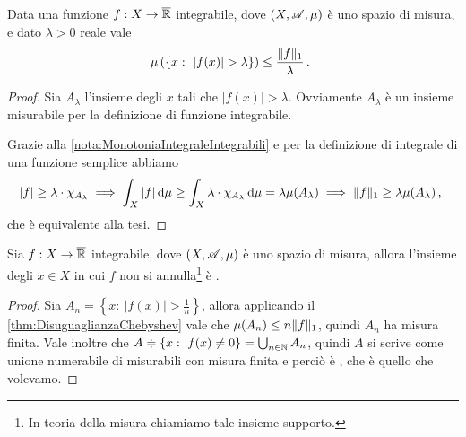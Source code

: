 \begin{theorem}\label{thm:DisuguaglianzaChebyshev}
	Data una funzione $f:X\to\overline{\mathbb R}$ integrabile, dove $(X,\mathscr A,\mu)$ è uno spazio di misura, e dato $\lambda>0$ reale vale
	\begin{equation*}
		\mu\left(\left\{x:\ |f(x)|>\lambda\right\}\right) \le \frac{\LNorm f}{\lambda}\punto
	\end{equation*}
\end{theorem}
\begin{proof}
	Sia $A_\lambda$ l'insieme degli $x$ tali che $|f(x)|>\lambda$. Ovviamente $A_\lambda$ è un insieme misurabile per la definizione di funzione integrabile.
	
	Grazie alla \cref{nota:MonotoniaIntegraleIntegrabili} e per la definizione di integrale di una funzione semplice abbiamo
	\begin{equation*}
		|f|\ge\lambda \cdot \chi_{A_\lambda} \implies \int_X |f|\,\mathrm d\mu \ge \int_X \lambda\cdot\chi_{A_\lambda}\,\mathrm d\mu=\lambda\mu(A_\lambda)\implies
		\Vert f\Vert_1\ge \lambda\mu(A_\lambda)\, \text{, }
	\end{equation*}
	che è equivalente alla tesi.
\end{proof}

\begin{corollary}\label{cor:SupportoIntegrabile}
	Sia $f:X\to\overline{\mathbb R}$ integrabile, dove $(X,\mathscr A,\mu)$ è uno spazio di misura, allora l'insieme degli $x\in X$ in cui $f$ non si annulla\footnote{In teoria della misura chiamiamo tale insieme supporto.} è \sigfin[o].
\end{corollary}
\begin{proof}
	Sia $A_n=\left\{x:\ |f(x)|>\frac 1n \right\}$, allora applicando il \cref{thm:DisuguaglianzaChebyshev} vale che $\mu(A_n)\le n \Vert f\Vert_1$, quindi $A_n$ ha misura finita. Vale inoltre che $A\doteqdot\left\{x:\ f(x)\not=0 \right\}=\bigcup_{n\in\mathbb N}A_n$, quindi $A$ si scrive come unione numerabile di misurabili con misura finita e perciò è \sigfin[o], che è quello che volevamo.
\end{proof}


